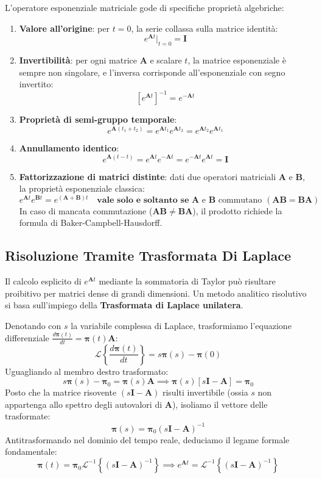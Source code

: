 \documentclass[11pt, a4paper]{article}
\begin{document}
L'operatore esponenziale matriciale gode di specifiche proprietà algebriche:
\begin{enumerate}[leftmargin=*]
    \item \textbf{Valore all'origine}: per $t = 0$, la serie collassa sulla matrice identità:
    \[
        e^{\bm{A}t}\Big|_{t=0} = \bm{I}
    \]
    \item \textbf{Invertibilità}: per ogni matrice $\bm{A}$ e scalare $t$, la matrice esponenziale è sempre non singolare, e l'inversa corrisponde all'esponenziale con segno invertito:
    \[
        [e^{\bm{A}t}]^{-1} = e^{-\bm{A}t}
    \]
    \item \textbf{Proprietà di semi-gruppo temporale}:
    \[
        e^{\bm{A}(t_1 + t_2)} = e^{\bm{A}t_1} e^{\bm{A}t_2} = e^{\bm{A}t_2} e^{\bm{A}t_1}
    \]
    \item \textbf{Annullamento identico}:
    \[
        e^{\bm{A}(t - t)} = e^{\bm{A}t} e^{-\bm{A}t} = e^{-\bm{A}t} e^{\bm{A}t} = \bm{I}
    \]
    \item \textbf{Fattorizzazione di matrici distinte}: dati due operatori matriciali $\bm{A}$ e $\bm{B}$, la proprietà esponenziale classica:
    \[
        \boxed{e^{\bm{A}t} e^{\bm{B}t} = e^{(\bm{A} + \bm{B})t} \quad \textbf{vale solo e soltanto se } \bm{A} \text{ e } \bm{B} \text{ commutano } (\bm{A}\bm{B} = \bm{B}\bm{A})}
    \]
    In caso di mancata commutazione ($\bm{A}\bm{B} \neq \bm{B}\bm{A}$), il prodotto richiede la formula di Baker-Campbell-Hausdorff.
\end{enumerate}

\subsection{Risoluzione Tramite Trasformata Di Laplace}

Il calcolo esplicito di $e^{\bm{A}t}$ mediante la sommatoria di Taylor può risultare proibitivo per matrici dense di grandi dimensioni. Un metodo analitico risolutivo si basa sull'impiego della \textbf{Trasformata di Laplace unilatera}.

Denotando con $s$ la variabile complessa di Laplace, trasformiamo l'equazione differenziale $\frac{d\bm{\pi}(t)}{dt} = \bm{\pi}(t)\bm{A}$:
\[
    \mathcal{L}\left\{ \frac{d\bm{\pi}(t)}{dt} \right\} = s \bm{\pi}(s) - \bm{\pi}(0)
\]
Uguagliando al membro destro trasformato:
\[
    s \bm{\pi}(s) - \bm{\pi}_0 = \bm{\pi}(s)\bm{A} \implies \bm{\pi}(s) \left[ s\bm{I} - \bm{A} \right] = \bm{\pi}_0
\]
Posto che la matrice risovente $(s\bm{I} - \bm{A})$ risulti invertibile (ossia $s$ non appartenga allo spettro degli autovalori di $\bm{A}$), isoliamo il vettore delle trasformate:
\[
    \bm{\pi}(s) = \bm{\pi}_0 (s\bm{I} - \bm{A})^{-1}
\]
Antitrasformando nel dominio del tempo reale, deduciamo il legame formale fondamentale:
\[
    \bm{\pi}(t) = \bm{\pi}_0 \mathcal{L}^{-1}\left\{ (s\bm{I} - \bm{A})^{-1} \right\} \implies \boxed{e^{\bm{A}t} = \mathcal{L}^{-1}\left\{ (s\bm{I} - \bm{A})^{-1} \right\}}
\]
\end{document}
